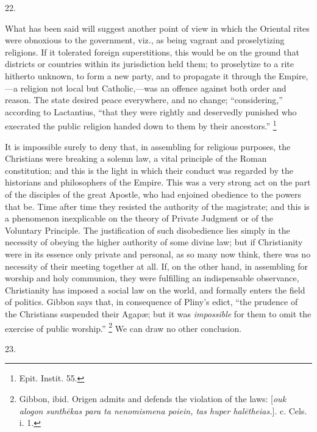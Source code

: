 22.

What has been said will suggest another point of view
in which the Oriental rites were obnoxious to the
government, viz., as being vagrant and proselytizing
religions. If it tolerated foreign superstitions, this
would be on the ground that districts or countries within
its jurisdiction held them; to proselytize to a rite
hitherto unknown, to form a new party, and to propagate
it through the Empire,—a religion not local but
Catholic,—was an offence against both order and
reason. The state desired peace everywhere, and no
change; ``considering,'' according to Lactantius,
``that they were rightly and deservedly punished who
execrated the public religion handed down to them by
their ancestors.'' \footnote{Epit. Instit. 55.}

It is impossible surely to deny that, in assembling
for religious purposes, the Christians were breaking a
solemn law, a vital principle of the Roman constitution;
and this is the light in which their conduct was regarded
by the historians and philosophers of the Empire. This
was a very strong act on the part of the disciples of the
great Apostle, who had enjoined obedience to the powers
that be. Time after time they resisted the authority of
the magistrate; and this is a phenomenon inexplicable on
the theory of Private Judgment or of the Voluntary
Principle. The justification of such disobedience lies
simply in the necessity of obeying the higher authority
of some divine law; but if Christianity were in its
essence only private and personal, as so many now think,
there was no necessity of their meeting together at all.
If, on the other hand, in assembling for worship and holy
communion, they were fulfilling an indispensable
observance, Christianity has imposed a social law on the
world, and formally enters the field of politics. Gibbon
says that, in consequence of Pliny's edict, ``the
prudence of the Christians suspended their Agapæ; but it
was \emph{ impossible} for them to omit the exercise of public
worship.'' \footnote{Gibbon, ibid. Origen admits
and defends the violation of the laws: [\emph{ouk
alogon sunth\={e}kas para ta nenomismena poiein, tas huper hal\={e}theias.}].
c. Cels. i. 1.} We can draw no other conclusion.

23.

